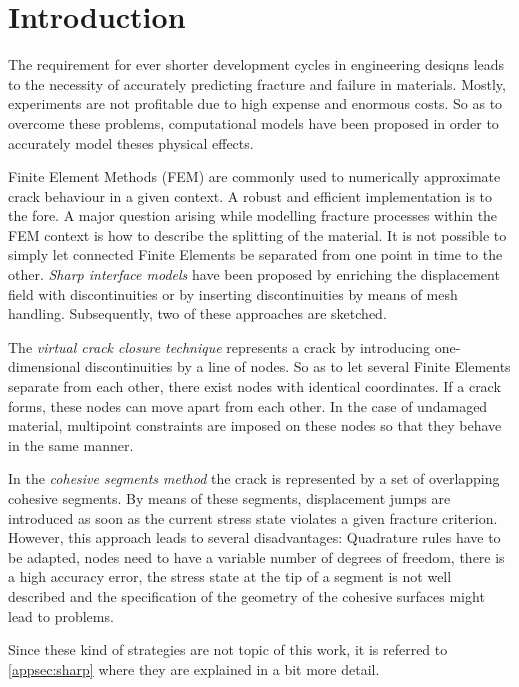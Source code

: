 \section{Introduction} \label{sec:intro}

The requirement for ever shorter development cycles in engineering desiqns leads to the necessity of accurately predicting fracture and failure in materials. Mostly, experiments are not profitable due to high expense and enormous costs. So as to overcome these problems, computational models have been proposed in order to accurately model theses physical effects. 

Finite Element Methods (FEM) are commonly used to numerically approximate crack behaviour in a given context. A robust and efficient implementation is to the fore. A major question arising while modelling fracture processes within the FEM context is how to describe the splitting of the material. It is not possible to simply let connected Finite Elements be separated from one point in time to the other. \textit{Sharp interface models} have been proposed by enriching the displacement field with discontinuities or by inserting discontinuities by means of mesh handling. Subsequently, two of these approaches are sketched.

The \textit{virtual crack closure technique} represents a crack by introducing one-dimensional discontinuities by a line of nodes. So as to let several Finite Elements separate from each other, there exist nodes with identical coordinates. If a crack forms, these nodes can move apart from each other. In the case of undamaged material, multipoint constraints are imposed on these nodes so that they behave in the same manner. \cite{03_SotA_virtClos} 

In the \textit{cohesive segments method} the crack is represented by a set of overlapping cohesive segments. By means of these segments, displacement jumps are introduced as soon as the current stress state violates a given fracture criterion. However, this approach leads to several disadvantages: Quadrature rules have to be adapted, nodes need to have a variable number of degrees of freedom, there is a high accuracy error, the stress state at the tip of a segment is not well described and the specification of the geometry of the cohesive surfaces might lead to problems. \cite{02_SotA_cohes}\cite{01_SotA_cohes_dyn} 

Since these kind of strategies are not topic of this work, it is referred to \ref{appsec:sharp} where they are explained in a bit more detail.

